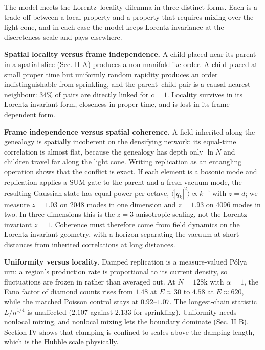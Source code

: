 The model meets the Lorentz--locality dilemma in three
distinct forms. Each is a trade-off between a local property
and a property that requires mixing over the light cone, and
in each case the model keeps Lorentz invariance at the
discreteness scale and pays elsewhere.

\textbf{Spatial locality versus frame independence.} A child
placed near its parent in a spatial slice (Sec. II A)
produces a non-manifoldlike order. A child placed at small
proper time but uniformly random rapidity produces an order
indistinguishable from sprinkling, and the parent--child
pair is a causal nearest neighbour: 34\% of pairs are
directly linked for \(c=1\). Locality survives in its
Lorentz-invariant form, closeness in proper time, and is
lost in its frame-dependent form.

\textbf{Frame independence versus spatial coherence.} A
field inherited along the genealogy is spatially incoherent
on the densifying network: its equal-time correlation is
almost flat, because the genealogy has depth only \(\ln N\)
and children travel far along the light cone. Writing
replication as an entangling operation shows that the
conflict is exact. If each element is a bosonic mode and
replication applies a SUM gate to the parent and a fresh
vacuum mode, the resulting Gaussian state has equal power
per octave, \(\langle|q_k|^2\rangle\propto k^{-z}\) with
\(z=d\); we measure \(z=1.03\) on 2048 modes in one
dimension and \(z=1.93\) on 4096 modes in two. In three
dimensions this is the \(z=3\) anisotropic scaling, not the
Lorentz-invariant \(z=1\). Coherence must therefore come
from field dynamics on the Lorentz-invariant geometry, with
a horizon separating the vacuum at short distances from
inherited correlations at long distances.

\textbf{Uniformity versus locality.} Damped replication is a
measure-valued Pólya urn: a region's production rate is
proportional to its current density, so fluctuations are
frozen in rather than averaged out. At \(N=128\)k with
\(\alpha=1\), the Fano factor of diamond counts rises from
\(1.48\) at \(E\approx30\) to \(4.58\) at \(E\approx620\),
while the matched Poisson control stays at
\(0.92\)--\(1.07\). The longest-chain statistic
\(L/n^{1/4}\) is unaffected (\(2.107\) against \(2.133\) for
sprinkling). Uniformity needs nonlocal mixing, and nonlocal
mixing lets the boundary dominate (Sec. II B). Section IV
shows that clumping is confined to scales above the damping
length, which is the Hubble scale physically.

